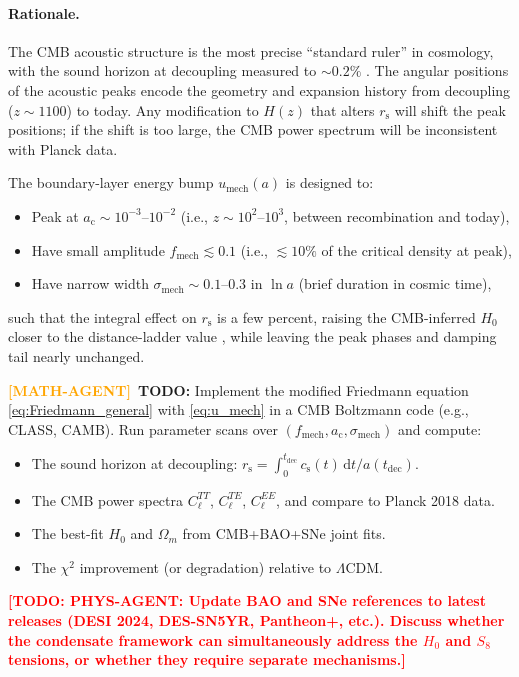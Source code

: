 \documentclass[11pt,a4paper]{article}
\newcommand{\dx}{\mathrm{d}}
\newcommand{\ac}{a_{\mathrm{c}}}
\newcommand{\rs}{r_{\mathrm{s}}}
\newcommand{\cs}{c_{\mathrm{s}}}
\newcommand{\sigmamech}{\sigma_{\mathrm{mech}}}
\newcommand{\fmech}{f_{\mathrm{mech}}}
\newcommand{\umech}{u_{\mathrm{mech}}}
\theoremstyle{definition}
\newcommand{\TODO}[1]{\textcolor{red}{\textbf{[TODO: #1]}}}
\newcommand{\MATHAGENT}{\textcolor{orange}{\textbf{[MATH-AGENT]}}}
\begin{document}
\paragraph{Rationale.}
The CMB acoustic structure is the most precise ``standard ruler'' in cosmology, with the sound horizon at decoupling measured to $\sim 0.2\%$ \cite{Planck2018}. The angular positions of the acoustic peaks encode the geometry and expansion history from decoupling ($z \sim 1100$) to today. Any modification to $H(z)$ that alters $\rs$ will shift the peak positions; if the shift is too large, the CMB power spectrum will be inconsistent with Planck data.

The boundary-layer energy bump $\umech(a)$ is designed to:
\begin{itemize}[leftmargin=1.8em]
  \item Peak at $\ac \sim 10^{-3}$--$10^{-2}$ (i.e., $z \sim 10^2$--$10^3$, between recombination and today),
  \item Have small amplitude $\fmech \lesssim 0.1$ (i.e., $\lesssim 10\%$ of the critical density at peak),
  \item Have narrow width $\sigmamech \sim 0.1$--$0.3$ in $\ln a$ (brief duration in cosmic time),
\end{itemize}
such that the integral effect on $\rs$ is a few percent, raising the CMB-inferred $H_0$ closer to the distance-ladder value \cite{EDEReview2023,PoulinReview2023}, while leaving the peak phases and damping tail nearly unchanged.

\MATHAGENT~\textbf{TODO:} Implement the modified Friedmann equation \eqref{eq:Friedmann_general} with \eqref{eq:u_mech} in a CMB Boltzmann code (e.g., CLASS, CAMB). Run parameter scans over $(\fmech, \ac, \sigmamech)$ and compute:
\begin{itemize}
  \item The sound horizon at decoupling: $\rs = \int_0^{t_{\mathrm{dec}}} \cs(t) \, \dx t / a(t_{\mathrm{dec}})$.
  \item The CMB power spectra $C_\ell^{TT}$, $C_\ell^{TE}$, $C_\ell^{EE}$, and compare to Planck 2018 data.
  \item The best-fit $H_0$ and $\Omega_m$ from CMB+BAO+SNe joint fits.
  \item The $\chi^2$ improvement (or degradation) relative to $\Lambda$CDM.
\end{itemize}

\TODO{PHYS-AGENT: Update BAO and SNe references to latest releases (DESI 2024, DES-SN5YR, Pantheon+, etc.). Discuss whether the condensate framework can simultaneously address the $H_0$ and $S_8$ tensions, or whether they require separate mechanisms.}
\end{document}
